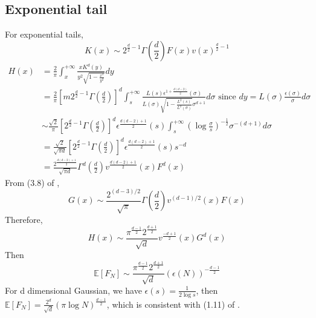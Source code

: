 \documentclass{article}
\def\E{\mathbb{E}}
\begin{document}
\subsection{Exponential tail}
For exponential tails,
\begin{equation}
    K(x) \sim 2^{\frac{d}{2}-1} \Gamma\left(\frac{d}{2}\right)F(x) v(x)^{\frac{d}{2}-1}    
\end{equation}
\begin{align*}
    H(x) & = \frac{2}{\pi} \int_x^{+\infty}\frac{x K^d(y)}{y^2 \sqrt{1-\frac{x^2}{y^2}}}dy\\
    &=\frac{2}{\pi}\left[m 2^{\frac{d}{2}-1} \Gamma\left(\frac{d}{2}\right)\right]^d
    \int_s^{+\infty}\frac{L(s) \epsilon^{1+\frac{d(d-2)}{2}}(\sigma)}{L(\sigma) \sqrt{1-\frac{L^2(s)}{L^2(\sigma)}}\sigma^{d+1}} d\sigma
    \textrm{ since } dy=L(\sigma)\frac{\epsilon(\sigma)}{\sigma}d\sigma \\
    &\sim  \frac{\sqrt{2}}{\pi}
    \left[2^{\frac{d}{2}-1} \Gamma\left(\frac{d}{2}\right)\right]^d
    \epsilon^{\frac{d(d-2)+1}{2}}(s)
    \int_s^{+\infty} \left(\log\frac{\sigma}{s}
    \right)^{-\frac{1}{2}}
    \sigma^{-(d+1)}d\sigma \\
    &= \frac{\sqrt{2}}{\sqrt{\pi d}}\left[2^{\frac{d}{2}-1} \Gamma\left(\frac{d}{2}\right)\right]^d
    \epsilon^{\frac{d(d-2)+1}{2}}(s)s^{-d}\\
    &= \frac{2^{\frac{d(d-2)+1}{2}}}{\sqrt{\pi d}}\Gamma^d\left(\frac{d}{2}\right)
    v^{\frac{d(d-2)+1}{2}}(x)F^d(x)
\end{align*}
From (3.8) of \cite{dwyer1991convex},
\begin{equation}
    G(x) \sim \frac{2^{(d-3)/2}}{\sqrt{\pi}}\Gamma(\frac{d}{2}) v^{(d-1)/2}(x) F(x)
\end{equation}
Therefore,
\begin{equation}
    H(x) \sim \frac{\pi^{\frac{d-1}{2}} 2^{\frac{d+1}{2}}}{\sqrt{d}}v^{\frac{-d+1}{2}}(x)G^d(x)
\end{equation}
Then
\begin{equation}
    \E[F_N]\sim \frac{\pi^{\frac{d-1}{2}} 2^{\frac{d+1}{2}}}{\sqrt{d}} (\epsilon(N))^{-\frac{d-1}{2}}
\end{equation}
For d dimensional Gaussian, we have $\epsilon(s)=\frac{1}{2\log s}$,
then $\E[F_N]=\frac{2^d}{\sqrt{d}}(\pi \log N)^{\frac{d-1}{2}}$,
which is consistent with (1.11) of \cite{raynaud1970enveloppe}.
\end{document}

